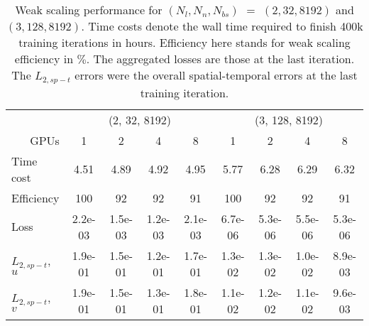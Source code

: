 \begin{table}[hbt!]
\centering
\singlespacing
\caption[
    PINNs, 2D TGV, $Re=100$: weak scaling performance for $(N_l, N_n, N_{bs})=(2, 32, 8192)$ and $(3, 128, 8192)$
]{
    Weak scaling performance for $(N_l, N_n, N_{bs})$ $=$ $(2, 32, 8192)$ and $(3, 128, 8192)$.%
    Time costs denote the wall time required to finish 400k training iterations in hours.%
    Efficiency here stands for weak scaling efficiency in $\%$.%
    The aggregated losses are those at the last iteration.%
    The $L_{2, sp-t}$ errors were the overall spatial-temporal errors at the last training iteration.%
}
\label{table:weak-scaling-perf}
\begin{tabular}{lcccccccc}
\toprule
 & \multicolumn{4}{c}{(2, 32, 8192)} & \multicolumn{4}{c}{(3, 128, 8192)} \\
\cmidrule(rl){2-5} \cmidrule(rl){6-9}
\multicolumn{1}{r}{GPUs} & 1 & 2 & 4 & 8 & 1 & 2 & 4 & 8 \\
\midrule
Time cost &  4.51 &  4.89 &  4.92 &  4.95 &  5.77 &  6.28 &  6.29 &  6.32 \\
\addlinespace
Efficiency & 100 & 92 & 92 & 91 & 100 & 92 & 92 & 91 \\
\addlinespace
Loss & 2.2e-03 & 1.5e-03 & 1.2e-03 & 2.1e-03 & 6.7e-06 & 5.3e-06 & 5.5e-06 & 5.3e-06 \\
\addlinespace
$L_{2,sp-t}$, $u$ & 1.9e-01 & 1.5e-01 & 1.2e-01 & 1.7e-01 & 1.3e-02 & 1.3e-02 & 1.0e-02 & 8.9e-03 \\
\addlinespace
$L_{2,sp-t}$, $v$ & 1.9e-01 & 1.5e-01 & 1.3e-01 & 1.8e-01 & 1.1e-02 & 1.2e-02 & 1.1e-02 & 9.6e-03 \\
\bottomrule
\end{tabular}
\end{table}
